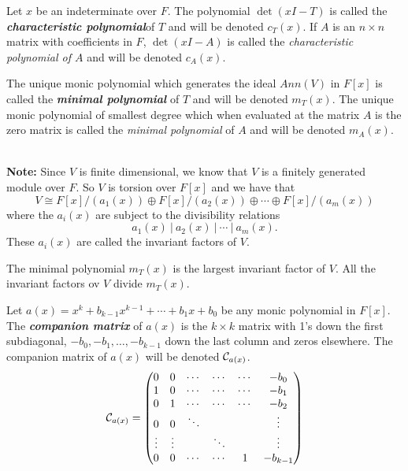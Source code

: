 \nl

\begin{defn}
Let $x$ be an indeterminate over $F$. The polynomial $\det(xI - T)$ is called the \textit{\textbf{characteristic polynomial}}of $T$ and will be denoted $c_T(x)$. If $A$ is an $n\times n$ matrix with coefficients in $F$, $\det(xI- A)$ is called the \textit{characteristic polynomial of $A$} and will be denoted $c_A(x)$.
\end{defn}

\nl

\begin{defn}
The unique monic polynomial which generates the ideal $Ann(V)$ in $F[x]$ is called the \textit{\textbf{minimal polynomial}} of $T$ and will be denoted $m_T(x)$. The unique monic polynomial of smallest degree which when evaluated at the matrix $A$ is the zero matrix is called the \textit{minimal polynomial} of $A$  and will be denoted $m_A(x)$.
\end{defn}
\nl\\
\textbf{Note:} Since $V$ is finite dimensional, we know that $V$ is a finitely generated module over $F$. So $V$ is torsion over $F[x]$ and we have that
\[V\cong F[x]/(a_1(x)) \oplus F[x]/(a_2(x))\oplus \cdots \oplus F[x]/(a_m(x))\]
where the $a_i(x)$ are subject to the divisibility relations
\[a_1(x)\ |\  a_2(x)\ |\ \cdots\ |\  a_m(x).\]
These $a_i(x)$ are called the invariant factors of $V$.

\nl

\begin{prop}
The minimal polynomial $m_T(x)$ is the largest invariant factor of $V$. All the invariant factors ov $V$ divide $m_T(x)$.
\end{prop}

\nl

\begin{defn}
Let $a(x) = x^k + b_{k - 1}x^{k - 1} + \cdots + b_1 x + b_0$ be any monic polynomial in $F[x]$. The \textit{\textbf{companion matrix}} of $a(x)$ is the $k\times k$ matrix with 1's down the first subdiagonal, $-b_0, -b_1, \ldots, -b_{k - 1}$ down the last column and zeros elsewhere. The companion matrix of $a(x)$ will be denoted $\mathcal{C}_{a(x)}$.
\[\mathcal{C}_{a(x)} = \begin{pmatrix}
0 & 0 & \cdots & \cdots & \cdots & -b_0\\
1 & 0 & \cdots & \cdots & \cdots & -b_1\\
0 & 1 & \cdots & \cdots & \cdots & -b_2\\
0 & 0 & \ddots &  &  & \vdots\\
\vdots & \vdots & & \ddots  &  & \vdots\\
0 & 0 & \cdots & \cdots & 1 & -b_{k - 1}\\
\end{pmatrix}\]
\end{defn}



